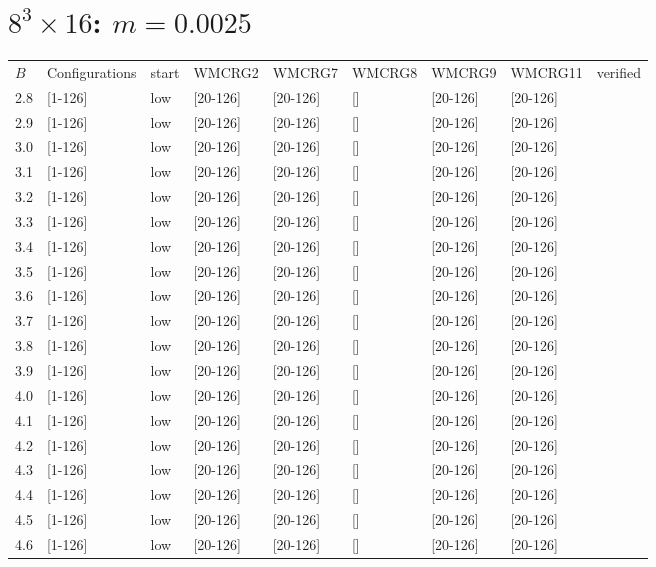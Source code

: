 \documentclass{article}
\begin{document}
  \section{$8^3\times16$:  $m=0.0025$}
    \begin{tabular}{ l | l | l | l | l }
      \hline
      $B$ & Configurations & start & WMCRG2 & WMCRG7 & WMCRG8 & WMCRG9 & WMCRG11 & verified\\
      2.8 & [1-126] & low & [20-126] & [20-126] & [] & [20-126] & [20-126] &\\
      2.9 & [1-126] & low & [20-126] & [20-126] & [] & [20-126] & [20-126] &\\
      3.0 & [1-126] & low & [20-126] & [20-126] & [] & [20-126] & [20-126] &\\
      3.1 & [1-126] & low & [20-126] & [20-126] & [] & [20-126] & [20-126] &\\
      3.2 & [1-126] & low & [20-126] & [20-126] & [] & [20-126] & [20-126] &\\
      3.3 & [1-126] & low & [20-126] & [20-126] & [] & [20-126] & [20-126] &\\
      3.4 & [1-126] & low & [20-126] & [20-126] & [] & [20-126] & [20-126] &\\
      3.5 & [1-126] & low & [20-126] & [20-126] & [] & [20-126] & [20-126] &\\
      3.6 & [1-126] & low & [20-126] & [20-126] & [] & [20-126] & [20-126] &\\
      3.7 & [1-126] & low & [20-126] & [20-126] & [] & [20-126] & [20-126] &\\
      3.8 & [1-126] & low & [20-126] & [20-126] & [] & [20-126] & [20-126] &\\
      3.9 & [1-126] & low & [20-126] & [20-126] & [] & [20-126] & [20-126] &\\
      4.0 & [1-126] & low & [20-126] & [20-126] & [] & [20-126] & [20-126] &\\
      4.1 & [1-126] & low & [20-126] & [20-126] & [] & [20-126] & [20-126] &\\
      4.2 & [1-126] & low & [20-126] & [20-126] & [] & [20-126] & [20-126] &\\
      4.3 & [1-126] & low & [20-126] & [20-126] & [] & [20-126] & [20-126] &\\
      4.4 & [1-126] & low & [20-126] & [20-126] & [] & [20-126] & [20-126] &\\
      4.5 & [1-126] & low & [20-126] & [20-126] & [] & [20-126] & [20-126] &\\
      4.6 & [1-126] & low & [20-126] & [20-126] & [] & [20-126] & [20-126] &\\

\end{tabular}
\end{document}
